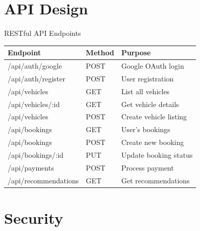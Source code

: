 \documentclass{beamer}
\begin{document}
\section{API Design}

\begin{frame}{RESTful API Endpoints}
\begin{table}
\scriptsize
\begin{tabular}{|l|l|l|}
\hline
\textbf{Endpoint} & \textbf{Method} & \textbf{Purpose} \\
\hline
/api/auth/google & POST & Google OAuth login \\
/api/auth/register & POST & User registration \\
/api/vehicles & GET & List all vehicles \\
/api/vehicles/:id & GET & Get vehicle details \\
/api/vehicles & POST & Create vehicle listing \\
/api/bookings & GET & User's bookings \\
/api/bookings & POST & Create new booking \\
/api/bookings/:id & PUT & Update booking status \\
/api/payments & POST & Process payment \\
/api/recommendations & GET & Get recommendations \\
\hline
\end{tabular}
\end{table}
\end{frame}

\section{Security}
\end{document}

